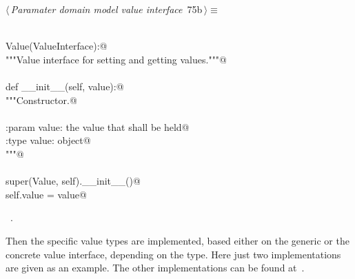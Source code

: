 \documentclass[
    a4paper,      %
    10pt,         %
    openright,    %
    notitlepage,  %
    parskip=half, %
]{scrreprt}       %
\theoremstyle{definition}                    %
\begin{document}
\begin{flushleft} \small
\begin{minipage}{\linewidth}\label{scrap121}\raggedright\small
{} $\langle\,${\itshape Paramater domain model value interface}\nobreak\ {\footnotesize {75b}}$\,\rangle\equiv$
\vspace{-1exm}
\begin{list}{}{} \item
\mbox{}\lstinline@@\\
\mbox{}\lstinline@class Value(ValueInterface):@\\
\mbox{}\lstinline@    """Value interface for setting and getting values."""@\\
\mbox{}\lstinline@@\\
\mbox{}\lstinline@    def __init__(self, value):@\\
\mbox{}\lstinline@        """Constructor.@\\
\mbox{}\lstinline@@\\
\mbox{}\lstinline@        :param value: the value that shall be held@\\
\mbox{}\lstinline@        :type  value: object@\\
\mbox{}\lstinline@        """@\\
\mbox{}\lstinline@@\\
\mbox{}\lstinline@        super(Value, self).__init__()@\\
\mbox{}\lstinline@        self.value = value@{\NWsep}
\end{list}
\vspace{-1.5ex}
\footnotesize
\begin{list}{}{\setlength{\itemsep}{-\parsep}\setlength{\itemindent}{-\leftmargin}}
\item \NWtxtMacroRefIn\ .

\item{}
\end{list}
\end{minipage}\vspace{4ex}
\end{flushleft}
Then the specific value types are implemented, based either on the generic or
the concrete value interface, depending on the type. Here just two
implementations are given as an example. The other implementations can be found
at~.
\end{document}
